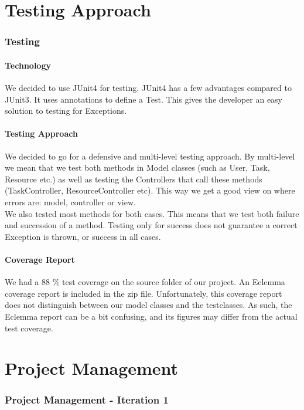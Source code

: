 \part{Testing Approach}
	
	\section{Testing}
		\subsection{Technology}
		We decided to use JUnit4 for testing.
		JUnit4 has a few advantages compared to JUnit3. It uses annotations to define a Test. This gives the developer an easy solution to testing for Exceptions.
		\subsection{Testing Approach}
		We decided to go for a defensive and multi-level testing approach.
		By multi-level we mean that we test both methods in Model classes (such as User, Task, Resource etc.) as well as testing the Controllers that call these methods (TaskController, ResourceController etc). 
		This way we get a good view on where errors are: model, controller or view.\\
		We also tested most methods for both cases. This means that we test both failure and succession of a method. Testing only for success does not guarantee a correct Exception is thrown, or success in all cases.
		\subsection{Coverage Report}
		We had a 88 \% test coverage on the source folder of our project. An Eclemma coverage report is included in the zip file. Unfortunately, this coverage report does not distinguish between our model classes and the testclasses. As such, the Eclemma report can be a bit confusing, and its figures may differ from the actual test coverage.
	
	\part{Project Management}
	
	\section{Project Management - Iteration 1}
